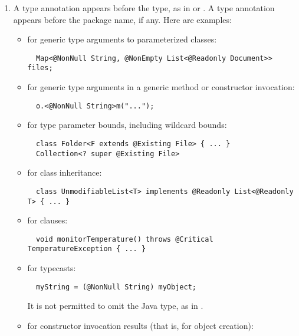 \documentclass[10pt]{article}
\begin{document}
\begin{enumerate}
\item
  A type annotation appears before the type, as in 
  or .  A type annotation appears before
  the package name, if any.
%
  Here are examples:
\begin{itemize}
\item for generic type arguments to parameterized classes:
\preverbnegspace
\begin{Verbatim}
  Map<@NonNull String, @NonEmpty List<@Readonly Document>> files;
\end{Verbatim}

\item for generic type arguments in a generic method or constructor invocation:
\preverbnegspace
\begin{Verbatim}
  o.<@NonNull String>m("...");
\end{Verbatim}

\item for type parameter bounds, including wildcard bounds:
\preverbnegspace
\begin{Verbatim}
  class Folder<F extends @Existing File> { ... }
  Collection<? super @Existing File>
\end{Verbatim}

\item for class inheritance:
\preverbnegspace
\begin{Verbatim}
  class UnmodifiableList<T> implements @Readonly List<@Readonly T> { ... }
\end{Verbatim}

\item for  clauses:
\preverbnegspace
\begin{Verbatim}
  void monitorTemperature() throws @Critical TemperatureException { ... }
\end{Verbatim}

\item for typecasts:
\preverbnegspace
\begin{Verbatim}
  myString = (@NonNull String) myObject;
\end{Verbatim}
\preverbnegspace
It is not permitted to omit the Java type, as in
.

\item for constructor invocation results (that is, for object creation):


\end{itemize}
\end{enumerate}
\end{document}

